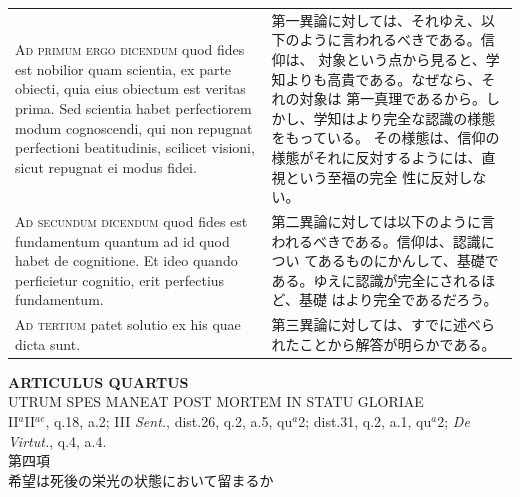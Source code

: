 \documentclass[paper=a4paper,fontsize=10pt,jafontsize=9pt,titlepage]{jlreq}
\begin{document}
\begin{longtable}{p{21em}p{21em}}
\\

 {\scshape Ad primum ergo dicendum} quod fides est nobilior quam
 scientia, ex parte obiecti, quia eius obiectum est veritas prima. Sed
 scientia habet perfectiorem modum cognoscendi, qui non repugnat
 perfectioni beatitudinis, scilicet visioni, sicut repugnat ei modus
 fidei.

 
 &

 第一異論に対しては、それゆえ、以下のように言われるべきである。信仰は、
 対象という点から見ると、学知よりも高貴である。なぜなら、それの対象は
 第一真理であるから。しかし、学知はより完全な認識の様態をもっている。
 その様態は、信仰の様態がそれに反対するようには、直視という至福の完全
 性に反対しない。

\\

 {\scshape Ad secundum dicendum} quod fides est fundamentum quantum ad
 id quod habet de cognitione. Et ideo quando perficietur cognitio,
 erit perfectius fundamentum.
 
&

 第二異論に対しては以下のように言われるべきである。信仰は、認識につい
 てあるものにかんして、基礎である。ゆえに認識が完全にされるほど、基礎
 はより完全であるだろう。

\\


 {\scshape Ad tertium} patet solutio ex his quae dicta sunt.
 
 &

 第三異論に対しては、すでに述べられたことから解答が明らかである。



\end{longtable}
\newpage




\begin{center}
{\Large {\bfseries ARTICULUS QUARTUS}}\\
{\large UTRUM SPES MANEAT POST MORTEM IN STATU GLORIAE}\\
{\footnotesize II$^{a}$II$^{ae}$, q.18, a.2; III {\itshape Sent.}, dist.26, q.2, a.5, qu$^{a}$2; dist.31, q.2, a.1, qu$^{a}$2; {\itshape De Virtut.}, q.4, a.4.}\\
{\Large 第四項\\希望は死後の栄光の状態において留まるか}
\end{center}
\end{document}
